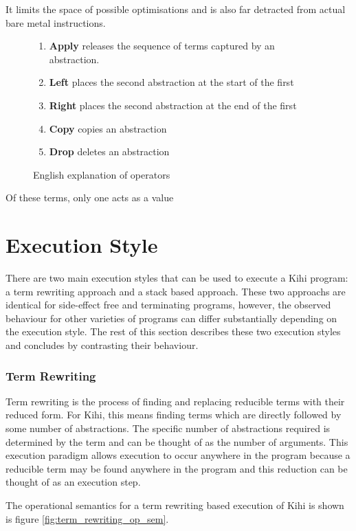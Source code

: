 It limits the space of possible
optimisations and is also far detracted from actual bare metal instructions.


\begin{figure}
    \centering
    \begin{enumerate}
        \item \textbf{Apply} releases the sequence of terms captured by an abstraction.
        \item \textbf{Left} places the second abstraction at the start of the first
        \item \textbf{Right} places the second abstraction at the end of the first
        \item \textbf{Copy} copies an abstraction
        \item \textbf{Drop} deletes an abstraction
    \end{enumerate}
    \caption{English explanation of operators}
    \label{fig:operator explanation}
\end{figure}

Of these terms, only one acts as a value

\section{Execution Style}
There are two main execution styles that can be used to execute
a Kihi program: a term rewriting approach and a stack based 
approach. These two approachs are identical for side-effect
free and terminating programs, however, the observed
behaviour for other varieties of programs can differ
substantially depending on the execution style. The rest of 
this section describes these two execution styles and 
concludes by contrasting their behaviour.

\subsubsection{Term Rewriting}
Term rewriting is the process of finding
and replacing reducible terms with their reduced form. For Kihi,
this means finding terms which are directly followed by
some number of abstractions. The specific number of abstractions
required is determined by the term and can be thought of as the
number of arguments. This execution paradigm allows execution
to occur anywhere in the program because a reducible term may
be found anywhere in the program and this reduction can be
thought of as an execution step.

The operational semantics for a term rewriting based execution of
Kihi is shown is figure \ref{fig:term_rewriting_op_sem}.

